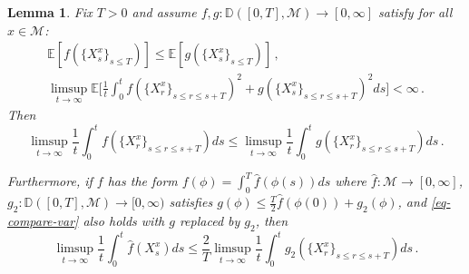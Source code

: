 \documentclass[final]{amsart}
\newtheorem{lem}[thm]{Lemma}
\numberwithin{thm}{section}
\numberwithin{equation}{section}
\newcommand{\E}{\mathbb{E}}
\newcommand{\mcM}{\mathcal{M}}
\newcommand{\D}{\mathbb{D}}
\begin{document}
\begin{lem}\label{comparison-result}
    Fix $T > 0$ and assume $f,g: \D([0,T], \mcM) \to [0,\infty]$ satisfy for all $x \in \mcM$:
    \begin{gather}\label{eq-compare-exp}
        \E[f(\{X_s^x\}_{s \leq T})] \leq \E[g(\{X_s^x\}_{s \leq T})] \,,
    \\
    \label{eq-compare-var}
        \limsup_{t \to \infty} \E\Big[\frac{1}{t}\int_0^t f(\{X_r^x\}_{s\leq r \leq s+T})^2 + g(\{X_s^x\}_{s \leq r \leq s+T})^2ds\Big] < \infty \,.
    \end{gather}
    Then
    \begin{equation}\label{eq:comparison-result-1}
        \limsup_{t \to \infty} \frac{1}{t}\int_0^t f(\{X_r^x\}_{s\leq r \leq s+T})ds \leq \limsup_{t \to \infty} \frac{1}{t}\int_0^t g(\{X_r^x\}_{s\leq r \leq s+T})ds \,.
    \end{equation}

    Furthermore, if $f$ has the form $f(\phi) = \int_0^T \hat f(\phi(s))ds$ where $\hat f: \mcM \to [0,\infty]$, $g_2: \D([0,T],\mcM) \to [0,\infty)$ satisfies $g(\phi) \leq \frac{T}{2}\hat f(\phi(0)) + g_2(\phi)$, and \eqref{eq-compare-var} also holds with $g$ replaced by $g_2$, then
    $$\limsup_{t \to \infty} \frac{1}{t}\int_0^t \hat f(X_s^x)ds \leq \frac{2}{T}\limsup_{t \to \infty} \frac{1}{t}\int_0^t g_2(\{X_r^x\}_{s\leq r \leq s+T})ds \,.$$

    
    
\end{lem}
\end{document}
